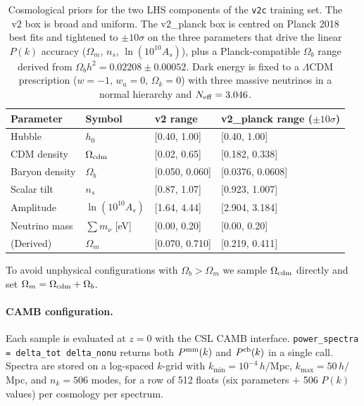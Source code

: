 \documentclass[11pt]{article}
\begin{document}
\begin{table}[h]
  \centering
  \begin{tabular}{l l l l}
    \toprule
    Parameter & Symbol & v2 range & v2\_planck range ($\pm 10\sigma$) \\
    \midrule
    Hubble           & $h_0$                & [0.40, 1.00]     & [0.40, 1.00] \\
    CDM density      & $\Omega_{\rm cdm}$   & [0.02, 0.65]     & [0.182, 0.338] \\
    Baryon density   & $\Omega_b$           & [0.050, 0.060]   & [0.0376, 0.0608] \\
    Scalar tilt      & $n_s$                & [0.87, 1.07]     & [0.923, 1.007] \\
    Amplitude        & $\ln(10^{10} A_s)$   & [1.64, 4.44]     & [2.904, 3.184] \\
    Neutrino mass    & $\sum m_\nu$ [eV]    & [0.00, 0.20]     & [0.00, 0.20] \\
    \midrule
    (Derived)        & $\Omega_m$           & [0.070, 0.710]   & [0.219, 0.411] \\
    \bottomrule
  \end{tabular}
  \caption{Cosmological priors for the two LHS components of the
  \texttt{v2c} training set. The v2 box is broad and uniform. The
  v2\_planck box is centred on Planck 2018 best fits and tightened to
  $\pm 10\sigma$ on the three parameters that drive the linear $P(k)$
  accuracy ($\Omega_m$, $n_s$, $\ln(10^{10} A_s)$), plus a
  Planck-compatible $\Omega_b$ range derived from
  $\Omega_b h^2 = 0.02208 \pm 0.00052$. Dark energy is fixed to a
  $\Lambda$CDM prescription ($w = -1$, $w_a = 0$, $\Omega_k = 0$)
  with three massive neutrinos in a normal hierarchy and
  $N_{\rm eff} = 3.046$.}
  \label{tab:priors}
\end{table}

To avoid unphysical configurations with $\Omega_b > \Omega_m$ we
sample $\Omega_{\rm cdm}$ directly and set
$\Omega_m = \Omega_{\rm cdm} + \Omega_b$.

\paragraph{CAMB configuration.} Each sample is evaluated at $z=0$
with the CSL CAMB interface.
\texttt{power\_spectra = delta\_tot\ delta\_nonu} returns both
$P^{\rm mm}(k)$ and $P^{\rm cb}(k)$ in a single call. Spectra are
stored on a log-spaced $k$-grid with $k_{\min} = 10^{-4}\,h/$Mpc,
$k_{\max} = 50\,h/$Mpc, and $n_k = 506$ modes, for a row of 512
floats (six parameters $+$ 506 $P(k)$ values) per cosmology per
spectrum.
\end{document}
